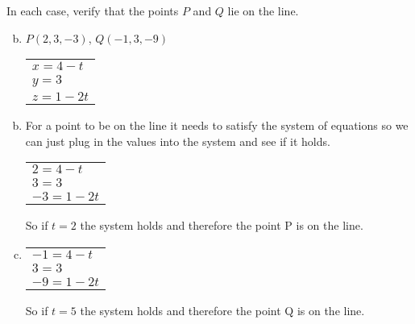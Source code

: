 \documentclass[../main.tex]{subfiles}
\begin{document}
In each case, verify that the points $P$ and $Q$ lie on the line.
\begin{enumerate}[a)]
	\setcounter{enumi}{1}
	\item $P(2, 3, -3)$, $Q(-1, 3, -9)$

		\begin{tabular}{l}
			$x = 4 - t$ \\
		 	$y = 3$ \\
			$z = 1 - 2t$
		\end{tabular}
\end{enumerate}

\solution
\begin{enumerate}[a)]
	\setcounter{enumi}{1}
	\item For a point to be on the line it needs to satisfy the system of equations so we can just plug in the values into the system and see if it holds.
	\begin{tabular}{l}
			$2 = 4 - t$ \\
		 	$3 = 3$ \\
			$-3 = 1 - 2t$
	\end{tabular}
	So if $t = 2$ the system holds and therefore the point P is on the line.
	\item 
		\begin{tabular}{l}
			$-1 = 4 - t$ \\
		 	$3 = 3$ \\
			$-9 = 1 - 2t$
		\end{tabular}
		So if $t = 5$ the system holds and therefore the point Q is on the line.
\end{enumerate}
\end{document}
